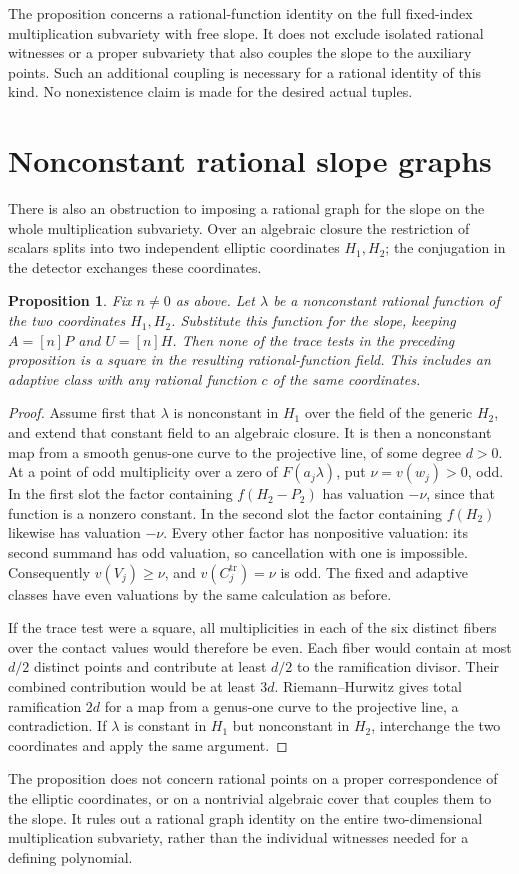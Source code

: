 \documentclass[11pt,a4paper]{article}
\newtheorem{proposition}{Proposition}
\begin{document}
The proposition concerns a rational-function identity on the full
fixed-index multiplication subvariety with free slope. It does not
exclude isolated rational witnesses or a proper subvariety that also
couples the slope to the auxiliary points. Such an additional coupling
is necessary for a rational identity of this kind. No nonexistence
claim is made for the desired actual tuples.

\section*{Nonconstant rational slope graphs}
There is also an obstruction to imposing a rational graph for the slope
on the whole multiplication subvariety. Over an algebraic closure the
restriction of scalars splits into two independent elliptic coordinates
$H_1,H_2$; the conjugation in the detector exchanges these coordinates.

\begin{proposition}
Fix $n\ne0$ as above. Let $\lambda$ be a nonconstant rational function
of the two coordinates $H_1,H_2$. Substitute this function for the slope,
keeping $A=[n]P$ and $U=[n]H$. Then none of the trace tests in the
preceding proposition is a square in the resulting rational-function
field. This includes an adaptive class with any rational function $c$
of the same coordinates.
\end{proposition}
\begin{proof}
Assume first that $\lambda$ is nonconstant in $H_1$ over the field of
the generic $H_2$, and extend that constant field to an algebraic closure.
It is then a nonconstant map from a smooth genus-one curve to the
projective line, of some degree $d>0$. At a point of odd multiplicity
over a zero of $F(a_j\lambda)$, put $\nu=v(w_j)>0$, odd.
In the first slot the factor containing $f(H_2-P_2)$ has valuation
$-\nu$, since that function is a nonzero constant. In the second slot
the factor containing $f(H_2)$ likewise has valuation $-\nu$.
Every other factor has nonpositive valuation: its second summand has
odd valuation, so cancellation with one is impossible. Consequently
$v(V_j)\ge\nu$, and $v(C_j^{\mathrm{tr}})=\nu$ is odd.
The fixed and adaptive classes have even valuations by the same
calculation as before.

If the trace test were a square, all multiplicities in each of the
six distinct fibers over the contact values would therefore be even.
Each fiber would contain at most $d/2$ distinct points and contribute
at least $d/2$ to the ramification divisor. Their combined contribution
would be at least $3d$. Riemann--Hurwitz gives total ramification
$2d$ for a map from a genus-one curve to the projective line, a
contradiction. If $\lambda$ is constant in $H_1$ but nonconstant in
$H_2$, interchange the two coordinates and apply the same argument.
\end{proof}

The proposition does not concern rational points on a proper
correspondence of the elliptic coordinates, or on a nontrivial
algebraic cover that couples them to the slope. It rules out a
rational graph identity on the entire two-dimensional multiplication
subvariety, rather than the individual witnesses needed for a
defining polynomial.
\end{document}
